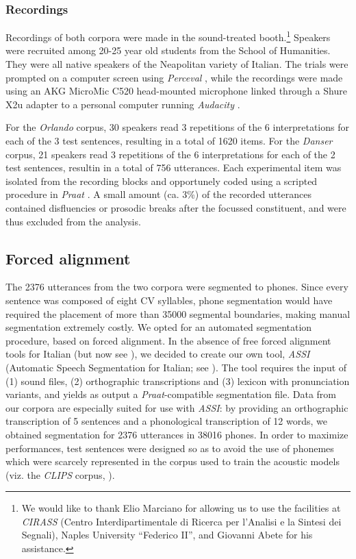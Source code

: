 \subsubsection{Recordings}\label{sec4213}
Recordings of both corpora were made in the sound-treated booth.\footnote{We would like to thank Elio Marciano for allowing us to use the facilities at \textit{CIRASS} (Centro Interdipartimentale di Ricerca per l'Analisi e la Sintesi dei Segnali), Naples University ``Federico II'', and Giovanni Abete for his assistance.} Speakers were recruited among 20-25 year old students from the School of Humanities. They were all native speakers of the Neapolitan variety of Italian. The trials were prompted on a computer screen using \textit{Perceval} \citep{andre2003perceval}, while the recordings were made using an AKG MicroMic C520 head-mounted microphone linked through a Shure X2u adapter to a personal computer running \textit{Audacity} \citep{audacity2006audacity}. 

For the \textit{Orlando} corpus, 30 speakers read 3 repetitions of the 6 interpretations for each of the 3 test sentences, resulting in a total of 1620 items. For the \textit{Danser} corpus, 21 speakers read 3 repetitions of the 6 interpretations for each of the 2 test sentences, resultin in a total of 756 utterances. Each experimental item was isolated from the recording blocks and opportunely coded using a scripted procedure in \textit{Praat} \citep{boersma2008praat}. A small amount (ca. 3\%) of the recorded utterances contained disfluencies or prosodic breaks after the focussed constituent, and were thus excluded from the analysis. 

\subsection{Forced alignment}\label{sec422}
The 2376 utterances from the two corpora were segmented to phones. Since every sentence was composed of eight CV syllables, phone segmentation would have required the placement of more than 35000 segmental boundaries, making manual segmentation extremely costly. We opted for an automated segmentation procedure, based on forced alignment. In the absence of free forced alignment tools for Italian (but now see \citealt{bigi2012speech}), we decided to create our own tool, \textit{ASSI} (Automatic Speech Segmentation for Italian; see \citealt{cangemi2011automatic}). The tool requires the input of (1) sound files, (2) orthographic transcriptions and (3) lexicon with pronunciation variants, and yields as output a \textit{Praat}-compatible segmentation file. Data from our corpora are especially suited for use with \textit{ASSI}: by providing an orthographic transcription of 5 sentences and a phonological transcription of 12 words, we obtained segmentation for 2376 utterances in 38016 phones. In order to maximize performances, test sentences were designed so as to avoid the use of phonemes which were scarcely represented in the corpus used to train the acoustic models (viz. the \textit{CLIPS} corpus, \citealt{savy2009clips}). 

